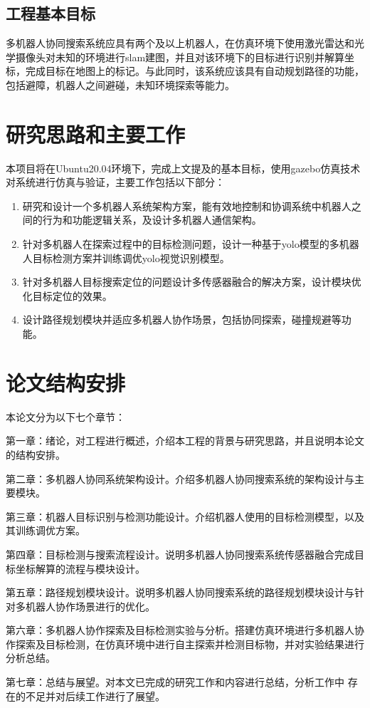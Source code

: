 \subsection{工程基本目标}
多机器人协同搜索系统应具有两个及以上机器人，在仿真环境下使用激光雷达和光学摄像头对未知的环境进行slam建图，并且对该环境下的目标进行识别并解算坐标，完成目标在地图上的标记。与此同时，该系统应该具有自动规划路径的功能，包括避障，机器人之间避碰，未知环境探索等能力。


\section{研究思路和主要工作}
本项目将在Ubuntu20.04环境下，完成上文提及的基本目标，使用gazebo仿真技术对系统进行仿真与验证，主要工作包括以下部分：
\begin{enumerate}
\item 研究和设计一个多机器人系统架构方案，能有效地控制和协调系统中机器人之间的行为和功能逻辑关系，及设计多机器人通信架构。
\item 针对多机器人在探索过程中的目标检测问题，设计一种基于yolo模型的多机器人目标检测方案并训练调优yolo视觉识别模型。
\item 针对多机器人目标搜索定位的问题设计多传感器融合的解决方案，设计模块优化目标定位的效果。
\item 设计路径规划模块并适应多机器人协作场景，包括协同探索，碰撞规避等功能。
\end{enumerate}

\section{论文结构安排}
本论文分为以下七个章节：

第一章：绪论，对工程进行概述，介绍本工程的背景与研究思路，并且说明本论文的结构安排。

第二章：多机器人协同系统架构设计。介绍多机器人协同搜索系统的架构设计与主要模块。

第三章：机器人目标识别与检测功能设计。介绍机器人使用的目标检测模型，以及其训练调优方案。

第四章：目标检测与搜索流程设计。说明多机器人协同搜索系统传感器融合完成目标坐标解算的流程与模块设计。

第五章：路径规划模块设计。说明多机器人协同搜索系统的路径规划模块设计与针对多机器人协作场景进行的优化。

第六章：多机器人协作探索及目标检测实验与分析。搭建仿真环境进行多机器人协作探索及目标检测，在仿真环境中进行自主探索并检测目标物，并对实验结果进行分析总结。

第七章：总结与展望。对本文已完成的研究工作和内容进行总结，分析工作中
存在的不足并对后续工作进行了展望。